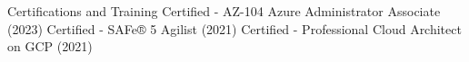 \begin{rubric}{Certifications and Training}
\entry*[] Certified - AZ-104 Azure Administrator Associate (2023)
\entry*[] Certified - SAFe® 5 Agilist (2021)
\entry*[] Certified - Professional Cloud Architect on GCP (2021)
\end{rubric}